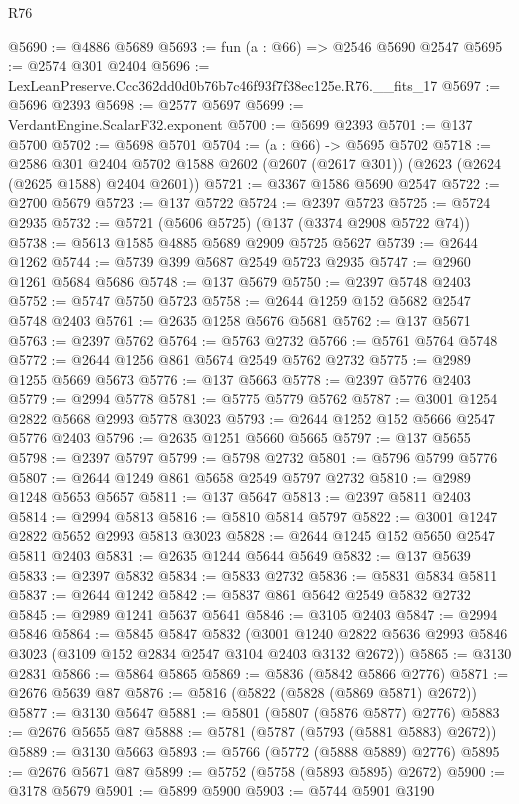 \begin{lexlean}{R76}
\begin{coremodule}
@5690 := @4886 @5689
@5693 := fun (a : @66) => @2546 @5690 @2547
@5695 := @2574 @301 @2404
@5696 := LexLeanPreserve.Ccc362dd0d0b76b7c46f93f7f38ec125e.R76.__fits_17
@5697 := @5696 @2393
@5698 := @2577 @5697
@5699 := VerdantEngine.ScalarF32.exponent
@5700 := @5699 @2393
@5701 := @137 @5700
@5702 := @5698 @5701
@5704 := (a : @66) -> @5695 @5702
@5718 := @2586
    @301
    @2404
    @5702
    @1588
    @2602
    (@2607 (@2617 @301))
    (@2623 (@2624 (@2625 @1588) @2404 @2601))
@5721 := @3367 @1586 @5690 @2547
@5722 := @2700 @5679
@5723 := @137 @5722
@5724 := @2397 @5723
@5725 := @5724 @2935
@5732 := @5721 (@5606 @5725) (@137 (@3374 @2908 @5722 @74))
@5738 := @5613 @1585 @4885 @5689 @2909 @5725 @5627
@5739 := @2644 @1262
@5744 := @5739 @399 @5687 @2549 @5723 @2935
@5747 := @2960 @1261 @5684 @5686
@5748 := @137 @5679
@5750 := @2397 @5748 @2403
@5752 := @5747 @5750 @5723
@5758 := @2644 @1259 @152 @5682 @2547 @5748 @2403
@5761 := @2635 @1258 @5676 @5681
@5762 := @137 @5671
@5763 := @2397 @5762
@5764 := @5763 @2732
@5766 := @5761 @5764 @5748
@5772 := @2644 @1256 @861 @5674 @2549 @5762 @2732
@5775 := @2989 @1255 @5669 @5673
@5776 := @137 @5663
@5778 := @2397 @5776 @2403
@5779 := @2994 @5778
@5781 := @5775 @5779 @5762
@5787 := @3001 @1254 @2822 @5668 @2993 @5778 @3023
@5793 := @2644 @1252 @152 @5666 @2547 @5776 @2403
@5796 := @2635 @1251 @5660 @5665
@5797 := @137 @5655
@5798 := @2397 @5797
@5799 := @5798 @2732
@5801 := @5796 @5799 @5776
@5807 := @2644 @1249 @861 @5658 @2549 @5797 @2732
@5810 := @2989 @1248 @5653 @5657
@5811 := @137 @5647
@5813 := @2397 @5811 @2403
@5814 := @2994 @5813
@5816 := @5810 @5814 @5797
@5822 := @3001 @1247 @2822 @5652 @2993 @5813 @3023
@5828 := @2644 @1245 @152 @5650 @2547 @5811 @2403
@5831 := @2635 @1244 @5644 @5649
@5832 := @137 @5639
@5833 := @2397 @5832
@5834 := @5833 @2732
@5836 := @5831 @5834 @5811
@5837 := @2644 @1242
@5842 := @5837 @861 @5642 @2549 @5832 @2732
@5845 := @2989 @1241 @5637 @5641
@5846 := @3105 @2403
@5847 := @2994 @5846
@5864 := @5845
    @5847
    @5832
    (@3001 @1240 @2822 @5636 @2993 @5846 @3023 (@3109 @152 @2834 @2547 @3104 @2403 @3132 @2672))
@5865 := @3130 @2831
@5866 := @5864 @5865
@5869 := @5836 (@5842 @5866 @2776)
@5871 := @2676 @5639 @87
@5876 := @5816 (@5822 (@5828 (@5869 @5871) @2672))
@5877 := @3130 @5647
@5881 := @5801 (@5807 (@5876 @5877) @2776)
@5883 := @2676 @5655 @87
@5888 := @5781 (@5787 (@5793 (@5881 @5883) @2672))
@5889 := @3130 @5663
@5893 := @5766 (@5772 (@5888 @5889) @2776)
@5895 := @2676 @5671 @87
@5899 := @5752 (@5758 (@5893 @5895) @2672)
@5900 := @3178 @5679
@5901 := @5899 @5900
@5903 := @5744 @5901 @3190

\end{coremodule}
\end{lexlean}
